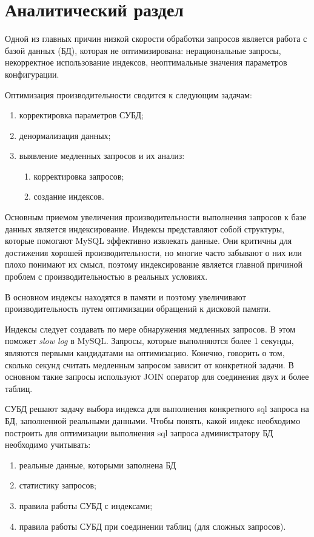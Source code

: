 \chapter{Аналитический раздел}

Одной из главных причин низкой скорости обработки запросов является работа с базой данных (БД), которая не оптимизирована: нерациональные запросы, некорректное использование индексов, неоптимальные значения параметров конфигурации. 

Оптимизация производительности сводится к следующим задачам: 
\begin{enumerate}
    \item корректировка параметров СУБД;
    \item денормализация данных;
    \item выявление медленных запросов и их анализ:
        \begin{enumerate}
            \item корректировка запросов;
            \item создание индексов.
        \end{enumerate}
\end{enumerate}

Основным приемом увеличения производительности выполнения запросов к базе данных является индексирование. Индексы представляют собой структуры, которые помогают MySQL эффективно извлекать данные. Они критичны для достижения хорошей производительности, но многие часто забывают о них или плохо понимают их смысл, поэтому индексирование является главной причиной проблем с производительностью в реальных условиях. \cite{zaitsev}

В основном индексы находятся в памяти и поэтому увеличивают производительность путем оптимизации обращений к дисковой памяти.

Индексы следует создавать по мере обнаружения медленных запросов. В этом поможет \textit{slow log} в MySQL. Запросы, которые выполняются более 1 секунды, являются первыми кандидатами на оптимизацию. \cite{ruhighload-mysql-indexes} Конечно, говорить о том, сколько секунд считать медленным запросом зависит от конкретной задачи. В основном такие запросы используют JOIN оператор для соединения двух и более таблиц.

СУБД решают задачу выбора индекса для выполнения конкретного sql запроса на БД, заполненной реальными данными. Чтобы понять, какой индекс необходимо построить для оптимизации выполнения sql запроса администратору БД необходимо учитывать:
\begin{enumerate}
    \item реальные данные, которыми заполнена БД
    \item статистику запросов;
    \item правила работы СУБД с индексами;
    \item правила работы СУБД при соединении таблиц (для сложных запросов).
\end{enumerate}

